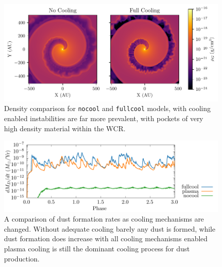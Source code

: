 \begin{figure}
  \centering
  \includegraphics{assets/results/radiative/radiative-rho.pdf}
  \caption[Instabilities due to cooling]{Density comparison for \texttt{nocool} and \texttt{fullcool} models, with cooling enabled instabilities are far more prevalent, with pockets of very high density material within the WCR.}
  \label{fig:coolingprocess-density}
\end{figure}

\begin{figure}
  \centering
  \includegraphics{assets/cool-results/cool-phase-dust_rate.pdf}
  \caption[Comparison of dust formation rates with cooling methods]{A comparison of dust formation rates as cooling mechanisms are changed. Without adequate cooling barely any dust is formed, while dust formation does increase with all cooling mechanisms enabled plasma cooling is still the dominant cooling process for dust production.}
  \label{fig:coolingprocess-dustproduction}
\end{figure}



